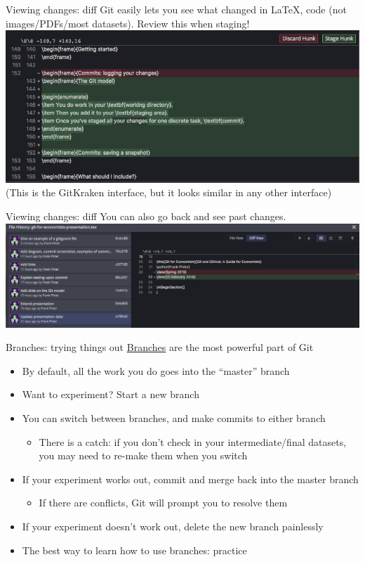 \documentclass{beamer}
\begin{document}
\begin{frame}{Viewing changes: diff}
Git easily lets you see what changed in \LaTeX, code (not images/PDFs/most datasets). Review this when staging!
\includegraphics[width=\textwidth]{screenshots/diff.png}
{\small (This is the GitKraken interface, but it looks similar in any other interface)}
\end{frame}

\begin{frame}{Viewing changes: diff}
You can also go back and see past changes.
\includegraphics[width=\textwidth]{screenshots/history-diff.png}
\end{frame}

\begin{frame}{Branches: trying things out}
\href{https://git-scm.com/book/en/v2/Git-Branching-Branches-in-a-Nutshell}{Branches} are the most powerful part of Git
\begin{itemize}
\item By default, all the work you do goes into the ``master'' branch
\item Want to experiment? Start a new branch
\item You can switch between branches, and make commits to either branch
\begin{itemize}
\item There is a catch: if you don't check in your intermediate/final datasets, you may need to re-make them when you switch
\end{itemize}
\item If your experiment works out, commit and merge back into the master branch
\begin{itemize}
\item If there are conflicts, Git will prompt you to resolve them
\end{itemize}
\item If your experiment doesn't work out, delete the new branch painlessly
\item The best way to learn how to use branches: practice
\end{itemize}
\end{frame}
\end{document}
